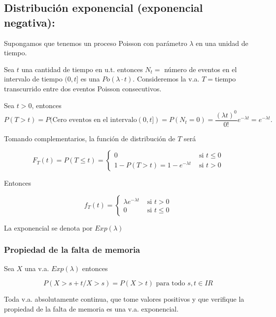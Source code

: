 \documentclass[12pt]{report}
\def\R{I\!\!R}
\begin{document}
\normalsize



         \subsection{Distribución exponencial (exponencial negativa):}
         Supongamos que tenemos un proceso Poisson con parámetro
         $\lambda$ en una unidad de tiempo.

         Sea $t$ una cantidad de tiempo en u.t. entonces $N_{t}=$ número de
         eventos en el intervalo de tiempo $(0,t]$
         es una $Po(\lambda\cdot t)$. Consideremos la v.a.
         $T=$tiempo transcurrido entre dos eventos Poisson consecutivos.

         Sea $t>0$, entonces
         $$P(T>t)=P(\mbox{Cero eventos en el
         intervalo}(0,t])
         =P(N_{t}=0)=
         \frac{(\lambda t)^0}{0!} e^{-\lambda
         t}=e^{-\lambda t}.$$


         Tomando complementarios, la función de distribución de $T$ será

         $$F_{T}(t)=P(T\leq t)=\left\{\begin{array}{ll} 0 &\mbox{ si } t\leq 0\\
          1-P(T>t)=1-e^{-\lambda t}& \mbox{ si } t>0\end{array}\right.$$

         Entonces

         $$f_{T}(t)=\left\{\begin{array}{ll}
         \lambda e^{-\lambda t} & \mbox{ si }  t>0\\
         0 & \mbox{ si } t\leq 0
         \end{array}\right.$$

         La exponencial se denota por $Exp(\lambda)$

\subsubsection{Propiedad de la falta de memoria}

          Sea $X$  una v.a. $Exp(\lambda)$ entonces

          $$P(X>s+t/X>s)=P(X>t)\mbox{  para todo } s,t\in \R$$

          Toda v.a. absolutamente continua, que tome valores positivos
          y que verifique la propiedad de la falta de memoria es una v.a.
          exponencial.
\end{document}
